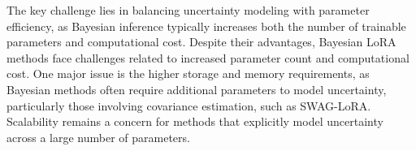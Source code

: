  The key challenge lies in balancing uncertainty modeling with parameter efficiency, as Bayesian inference typically increases both the number of trainable parameters and computational cost.
Despite their advantages, Bayesian LoRA methods face challenges related to increased parameter count and computational cost. One major issue is the higher storage and memory requirements, as Bayesian methods often require additional parameters to model uncertainty, particularly those involving covariance estimation, such as SWAG-LoRA. 
Scalability remains a concern for methods that explicitly model uncertainty across a large number of parameters.


